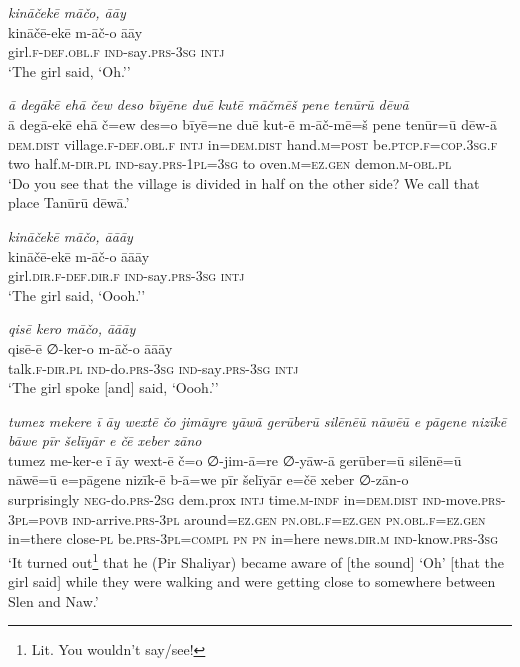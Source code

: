 \ea \label{ZP.57}
\textit{kināčekē māčo, āāy} \\ 
\gll kināčē-ekē m-āč-o āāy \\ 
 girl\textsc{.f}\textsc{-def}\textsc{.obl}\textsc{.f} \textsc{ind-}say\textsc{.prs}\textsc{-3sg} \textsc{intj} \\ 
\glt `The girl said, ‘Oh.’'
\z 
 
\ea \label{ZP.74}
\textit{ā degākē ehā čew deso bīyēne duē kutē māčmēš pene tenūrū dēwā} \\ 
\gll ā degā-ekē ehā č=ew des=o bīyē=ne duē kut-ē m-āč-mē=š pene tenūr=ū dēw-ā \\ 
 \textsc{dem.dist} village\textsc{.f}\textsc{-def}\textsc{.obl}\textsc{.f} \textsc{intj} in=\textsc{dem.dist} hand\textsc{.m}\textsc{=\textsc{post}} be\textsc{.ptcp}\textsc{.f}\textsc{=cop}\textsc{.3sg}\textsc{.f} two half\textsc{.m}\textsc{-dir}\textsc{.pl} \textsc{ind-}say\textsc{.prs}\textsc{-1pl}\textsc{=3sg} to oven\textsc{.m}\textsc{\textsc{=ez.gen}} demon\textsc{.m}\textsc{-obl}\textsc{.pl} \\ 
\glt `Do you see that the village is divided in half on the other side? We call that place Tanūrū dēwā.'
\z 
 
\ea \label{ŽP.172}
\textit{kināčekē māčo, āāāy} \\ 
\gll kināčē-ekē m-āč-o āāāy \\ 
 girl\textsc{.dir}\textsc{.f}\textsc{-def}\textsc{.dir}\textsc{.f} \textsc{ind-}say\textsc{.prs}\textsc{-3sg} \textsc{intj} \\ 
\glt `The girl said, ‘Oooh.’'
\z 
 
\ea \label{ŽP.173}
\textit{qisē kero māčo, āāāy} \\ 
\gll qisē-ē ∅-ker-o m-āč-o āāāy \\ 
 talk\textsc{.f}\textsc{-dir}\textsc{.pl} \textsc{ind-}do\textsc{.prs}\textsc{-3sg} \textsc{ind-}say\textsc{.prs}\textsc{-3sg} \textsc{intj} \\ 
\glt `The girl spoke [and] said, ‘Oooh.’'
\z 
 
\ea \label{ŽP.175}
\textit{tumez mekere ī āy wextē čo jimāyre yāwā gerūberū silēnēū nāwēū e pāgene nizīkē bāwe pīr šelīyār e čē xeber zāno} \\ 
\gll tumez me-ker-e ī āy wext-ē č=o ∅-jim-ā=re ∅-yāw-ā gerūber=ū silēnē=ū nāwē=ū e=pāgene nizīk-ē b-ā=we pīr šelīyār e=čē xeber ∅-zān-o \\ 
 surprisingly \textsc{neg-}do\textsc{.prs}-\textsc{2sg} dem.prox \textsc{intj} time\textsc{.m}\textsc{-indf} in=\textsc{dem.dist} \textsc{ind-}move\textsc{.prs}\textsc{-3pl}\textsc{=\textsc{povb}} \textsc{ind-}arrive\textsc{.prs}\textsc{-3pl} around\textsc{\textsc{=ez.gen}} \textsc{pn}\textsc{.obl}\textsc{.f}\textsc{\textsc{=ez.gen}} \textsc{pn}\textsc{.obl}\textsc{.f}\textsc{\textsc{=ez.gen}} in=there close\textsc{\textsc{-pl}} be\textsc{.prs}\textsc{-3pl}\textsc{=compl} \textsc{pn} \textsc{pn} in=here news\textsc{.dir}\textsc{.m} \textsc{ind-}know\textsc{.prs}\textsc{-3sg} \\ 
\glt `It turned out\footnote{Lit. You wouldn’t say/see!} that he (Pir Shaliyar) became aware of [the sound] ‘Oh’ [that the girl said] while they were walking and were getting close to somewhere between Slen and Naw.'
\z 
 
